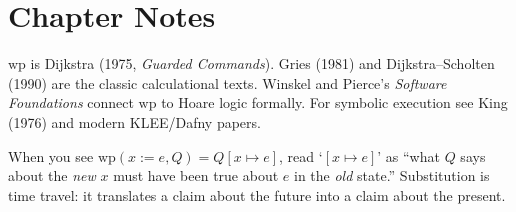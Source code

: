 \section*{Chapter Notes}
$\text{wp}$ is Dijkstra (1975, \emph{Guarded Commands}). Gries (1981) and Dijkstra--Scholten (1990) are the classic calculational texts. Winskel and Pierce's \emph{Software Foundations} connect $\text{wp}$ to Hoare logic formally. For symbolic execution see King (1976) and modern KLEE/Dafny papers.

\smallskip
\begin{remark}
When you see $\text{wp}(x:=e,Q)=Q[x\mapsto e]$, read `$[x\mapsto e]$' as ``what $Q$ says about the \emph{new} $x$ must have been true about $e$ in the \emph{old} state.'' Substitution is time travel: it translates a claim about the future into a claim about the present.
\end{remark}

